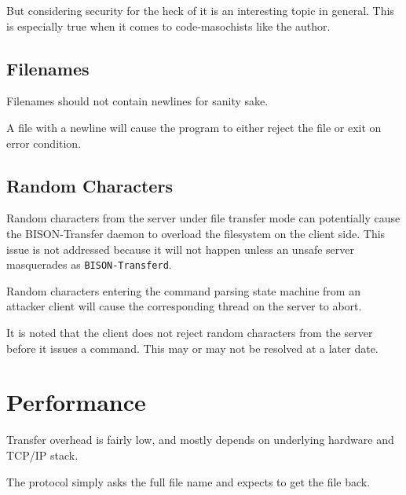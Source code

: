 \documentclass[12pt]{article}
\begin{document}
But considering security for the heck of it is an interesting topic in general.
This is especially true when it comes to code-masochists like the author.

\subsection{Filenames}
\label{ssec:Filenames}
Filenames should not contain newlines for sanity sake.

A file with a newline will cause the program to either reject the file or
exit on error condition.

\subsection{Random Characters}
\label{ssec:Random Characters}
Random characters from the server under file transfer mode can potentially
cause the BISON-Transfer daemon to overload the filesystem on the client side.
This issue is not addressed because it will not happen unless an unsafe server
masquerades as \verb+BISON-Transferd+.

Random characters entering the command parsing state machine from an attacker
client will cause the corresponding thread on the server to abort.

It is noted that the client does not reject random characters from the server
before it issues a command.  This may or may not be resolved at a later date.

\section{Performance}
\label{sec:Performance}
Transfer overhead is fairly low, and mostly depends on underlying hardware and
TCP/IP stack.

The protocol simply asks the full file name and expects to get the file back.
\end{document}
